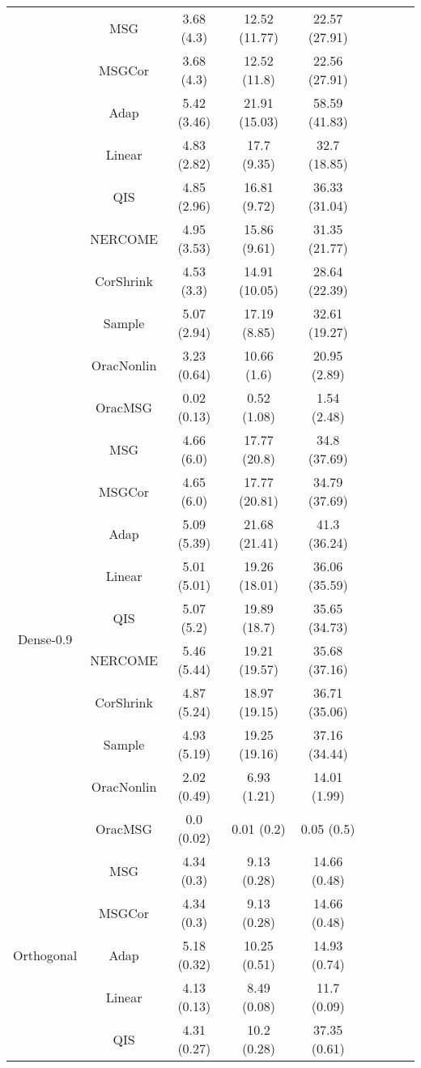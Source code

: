\documentclass[useAMS,referee,usenatbib]{biom}
\begin{document}
\begin{table}[H]
{\begin{tabular}{ccccccccc}
 & MSG & 3.68 (4.3)  & 12.52 (11.77) & 22.57 (27.91) \\
 & MSGCor   & 3.68 (4.3)  & 12.52 (11.8)  & 22.56 (27.91) \\
 & Adap     & 5.42 (3.46) & 21.91 (15.03) & 58.59 (41.83) \\
 & Linear         & 4.83 (2.82) & 17.7 (9.35)   & 32.7 (18.85)  \\
 & QIS            & 4.85 (2.96) & 16.81 (9.72)  & 36.33 (31.04) \\
 & NERCOME        & 4.95 (3.53) & 15.86 (9.61)  & 31.35 (21.77) \\
 & CorShrink      & 4.53 (3.3)  & 14.91 (10.05) & 28.64 (22.39) \\
 & Sample            & 5.07 (2.94) & 17.19 (8.85)  & 32.61 (19.27) \\
 & OracNonlin & 3.23 (0.64) & 10.66 (1.6)   & 20.95 (2.89)  \\
 & OracMSG  & 0.02 (0.13) & 0.52 (1.08)   & 1.54 (2.48)  \\ \midrule
\multirow{10}{*}{Dense-0.9}  
 & MSG & 4.66 (6.0)  & 17.77 (20.8)  & 34.8 (37.69)  \\
 & MSGCor   & 4.65 (6.0)  & 17.77 (20.81) & 34.79 (37.69) \\
 & Adap     & 5.09 (5.39) & 21.68 (21.41) & 41.3 (36.24)  \\
 & Linear         & 5.01 (5.01) & 19.26 (18.01) & 36.06 (35.59) \\
 & QIS            & 5.07 (5.2)  & 19.89 (18.7)  & 35.65 (34.73) \\
 & NERCOME        & 5.46 (5.44) & 19.21 (19.57) & 35.68 (37.16) \\
 & CorShrink      & 4.87 (5.24) & 18.97 (19.15) & 36.71 (35.06) \\
 & Sample            & 4.93 (5.19) & 19.25 (19.16) & 37.16 (34.44) \\
 & OracNonlin & 2.02 (0.49) & 6.93 (1.21)   & 14.01 (1.99)  \\
 & OracMSG  & 0.0 (0.02)  & 0.01 (0.2)    & 0.05 (0.5) \\ \midrule
\multirow{10}{*}{Orthogonal}  
 & MSG & 4.34 (0.3)  & 9.13 (0.28)  & 14.66 (0.48) \\
 & MSGCor   & 4.34 (0.3)  & 9.13 (0.28)  & 14.66 (0.48) \\
 & Adap     & 5.18 (0.32) & 10.25 (0.51) & 14.93 (0.74) \\
 & Linear         & 4.13 (0.13) & 8.49 (0.08)  & 11.7 (0.09)  \\
 & QIS            & 4.31 (0.27) & 10.2 (0.28)  & 37.35 (0.61) \\

\end{tabular}}
\end{table}
\end{document}

